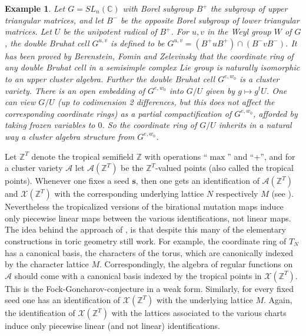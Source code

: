 \documentclass{emsprocart}
\newtheorem{example}[theorem]{Example}
\theoremstyle{definition}
\begin{document}
\begin{example}\label{doublebruhat}\rm 
Let $G=SL_n(\mathbb C)$ with Borel subgroup $B^+$ the subgroup of upper triangular matrices,
and let $B^-$ be the opposite Borel subgroup of lower triangular matrices. Let $U$ be the unipotent radical
of $B^+$. For $u, v$ in the Weyl group $W$ of $G$, the double Bruhat cell
$G^{u,v}$ is defined to be $G^{u,v} = (B^+uB^+) \cap (B^-vB^-)$. It has been proved by
Berenstein, Fomin and Zelevinsky \cite{BFZ} that the coordinate ring of any double Bruhat cell in a
semisimple complex Lie group is naturally isomorphic to an upper cluster algebra. Further the double Bruhat cell $G^{e,w_0}$ is a cluster variety.
There is an open embedding of $G^{e,w_0}$ into $G/U$ given by $g\mapsto g^t U$. 
One can view $G/U$ (up to codimension 2 differences, but this does not affect the corresponding coordinate rings) 
as a partial compactification of $G^{e,w_0}$, afforded by taking frozen variables to $0$. So the coordinate ring of $G/U$
inherits in a natural way a cluster algebra structure from $G^{e,w_0}$.
\end{example}
Let $\mathbb Z^T$ denote the tropical semifield $\mathbb Z$ with  operations ``$\max$'' and ``$+$'',
and for a cluster variety $\mathcal A$ let $\mathcal A(\mathbb Z^T)$ be the $\mathbb Z^T$-valued points 
(also called the tropical points).
Whenever one fixes a seed $\mathbf s$, then one gets an 
identification of $\mathcal A(\mathbb Z^T)$ and $\mathcal X(\mathbb Z^T)$ with the corresponding
underlying lattice $N$ respectively $M$ (see \cite{GHKK}).
Nevertheless the tropicalized versions of the birational mutation maps induce only piecewise linear maps between 
the various identifications, not linear maps. The idea behind the approach of \cite{FG}, \cite{GHKK} is
that despite this many of the elementary constructions in toric geometry still work. For example,
the coordinate ring of $T_{N}$ has a canonical basis, the characters of the torus, which are canonically
indexed by the character lattice $M$. Correspondingly, the algebra of regular functions on $\mathcal A$
should come with a canonical basis indexed by the tropical points in $\mathcal X(\mathbb Z^T)$. 
This is the Fock-Goncharov-conjecture in a weak form.
Similarly, for every fixed seed one has an identification of $\mathcal X(\mathbb Z^T)$ with the underlying 
lattice $M$.                     
Again, the identification of $\mathcal X (\mathbb Z^T)$ with the lattices associated to the various charts 
induce only piecewise linear (and not linear) identifications.
\end{document}
